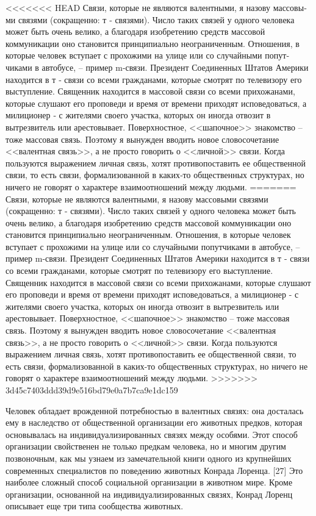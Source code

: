 \documentclass{book}
\begin{document}
<<<<<<< HEAD
Связи, которые не являются валентными, я назову массовы­ми связями  (сокращенно: т ‑  связями). Число таких связей у одного человека может быть очень велико, а благодаря изоб­ретению средств массовой коммуникации оно становится принципиально неограниченным. Отношения, в которые чело­век вступает с прохожими на улице или со случайными попут­чиками в автобусе, -- пример m‑связи. Президент Соединенных Штатов Америки находится в т ‑  связи со всеми гражданами, которые смотрят по телевизору его выступление. Священник находится в массовой связи со всеми прихожанами, которые слушают его проповеди и время от времени приходят испове­доваться, а милиционер ‑ с жителями своего участка, которых он иногда отвозит в вытрезвитель или арестовывает. Поверх­ностное, <<шапочное>> знакомство -- тоже массовая связь. Поэтому я вынужден вводить новое словосочетание <<валентная связь>>, а не просто говорить о <<личной>> связи. Когда пользуют­ся выражением личная связь,  хотят противопоставить ее об­щественной связи,  то есть связи, формализованной в каких‑то общественных структурах, но ничего не говорят о характере взаимоотношений между людьми.
=======
Связи, которые не являются валентными, я назову массовы­ми связями  (сокращенно: т -  связями). Число таких связей у одного человека может быть очень велико, а благодаря изоб­ретению средств массовой коммуникации оно становится принципиально неограниченным. Отношения, в которые чело­век вступает с прохожими на улице или со случайными попут­чиками в автобусе, -- пример m-связи. Президент Соединенных Штатов Америки находится в т -  связи со всеми гражданами, которые смотрят по телевизору его выступление. Священник находится в массовой связи со всеми прихожанами, которые слушают его проповеди и время от времени приходят испове­доваться, а милиционер - с жителями своего участка, которых он иногда отвозит в вытрезвитель или арестовывает. Поверх­ностное, <<шапочное>> знакомство -- тоже массовая связь. Поэтому я вынужден вводить новое словосочетание <<валентная связь>>, а не просто говорить о <<личной>> связи. Когда пользуют­ся выражением личная связь,  хотят противопоставить ее об­щественной связи,  то есть связи, 
формализованной в каких-то общественных структурах, но ничего не говорят о характере взаимоотношений между людьми.
>>>>>>> 3d45c7403ddd39d9e516bd79e0a7b7ca9e1dc159

Человек обладает врожденной потребностью в валентных связях: она досталась ему в наследство от общественной ор­ганизации его животных предков, которая основывалась на индивидуализированных связях между особями. Этот способ организации свойственен не только предкам человека, но и мно­гим другим позвоночным, как мы узнаем из замечательной книги одного из крупнейших современных специалистов по по­ведению животных Конрада Лоренца. [27] Это наиболее сложный способ социальной организации в животном мире. Кроме организации, основанной на индивидуализированных связях, Конрад Лоренц описывает еще три типа сообщества животных.
\end{document}
